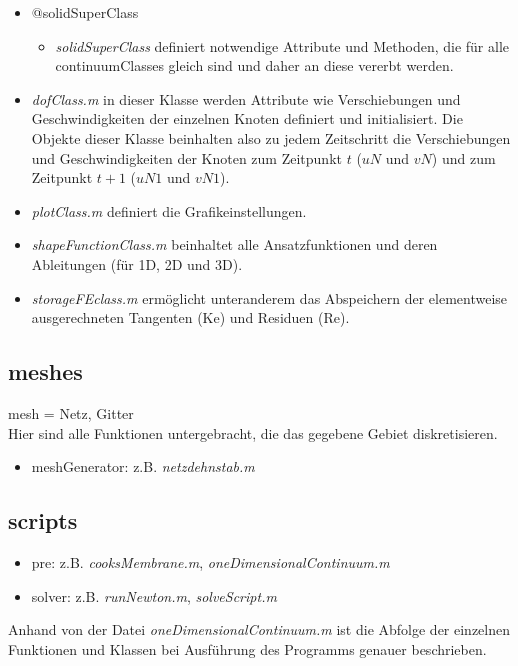 \documentclass[12pt,bibstyle=none,pagenumberinfooter]{ifmdocument}
\begin{document}
		\begin{itemize}
			\item @solidSuperClass
			\begin{itemize}
				\item \textit{solidSuperClass} definiert notwendige Attribute und Methoden, die für alle continuumClasses gleich sind und daher an diese vererbt werden.
			\end{itemize}
			\item \textit{dofClass.m} in dieser Klasse werden Attribute wie Verschiebungen und Geschwindigkeiten der einzelnen Knoten definiert und initialisiert. Die Objekte dieser Klasse beinhalten also zu jedem Zeitschritt die Verschiebungen und Geschwindigkeiten der Knoten zum Zeitpunkt $t$ ($uN$ und $vN$) und zum Zeitpunkt $t+1$ ($uN1$ und $vN1$).
			\item \textit{plotClass.m} definiert die Grafikeinstellungen.
			\item \textit{shapeFunctionClass.m} beinhaltet alle Ansatzfunktionen und deren Ableitungen (f\"ur 1D, 2D und 3D).
			\item \textit{storageFEclass.m} erm\"oglicht unteranderem das Abspeichern der elementweise ausgerechneten Tangenten (Ke) und Residuen (Re).
		\end{itemize}
	\subsection{meshes}
	mesh = Netz, Gitter\\
	Hier sind alle Funktionen untergebracht, die das gegebene Gebiet diskretisieren. 
		\begin{itemize}
			\item meshGenerator: z.B. \textit{netzdehnstab.m}
		\end{itemize}
	\subsection{scripts}
		\begin{itemize}
			\item pre: z.B. \textit{cooksMembrane.m}, \textit{oneDimensionalContinuum.m}
			\item solver: z.B. \textit{runNewton.m}, \textit{solveScript.m}
		\end{itemize}
	Anhand von der Datei \glqq \textit{oneDimensionalContinuum.m}\grqq{} ist die Abfolge der einzelnen Funktionen und Klassen bei Ausf\"uhrung des Programms genauer beschrieben.
		
\end{document}
